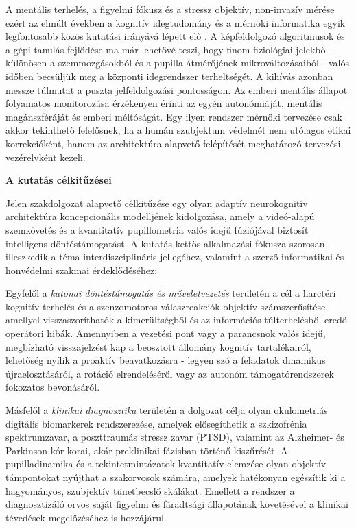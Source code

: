 \documentclass[12pt,a4paper,oneside]{book}
\begin{document}
A mentális terhelés, a figyelmi fókusz és a stressz objektív, non-invazív mérése ezért az elmúlt években a kognitív idegtudomány és a mérnöki informatika egyik legfontosabb közös kutatási irányává lépett elő \cite{eckstein2017}. A képfeldolgozó algoritmusok és a gépi tanulás fejlődése ma már lehetővé teszi, hogy finom fiziológiai jelekből - különösen a szemmozgásokból és a pupilla átmérőjének mikrováltozásaiból - valós időben becsüljük meg a központi idegrendszer terheltségét. A kihívás azonban messze túlmutat a puszta jelfeldolgozási pontosságon. Az emberi mentális állapot folyamatos monitorozása érzékenyen érinti az egyén autonómiáját, mentális magánszféráját és emberi méltóságát. Egy ilyen rendszer mérnöki tervezése csak akkor tekinthető felelősnek, ha a humán szubjektum védelmét nem utólagos etikai korrekcióként, hanem az architektúra alapvető felépítését meghatározó tervezési vezérelvként kezeli.

\vspace{0.5cm}
\newpage
\noindent\textbf{\large A kutatás célkitűzései}
\vspace{0.5cm}

Jelen szakdolgozat alapvető célkitűzése egy olyan adaptív neurokognitív architektúra koncepcionális modelljének kidolgozása, amely a videó-alapú szemkövetés és a kvantitatív pupillometria valós idejű fúziójával biztosít intelligens döntéstámogatást. A kutatás kettős alkalmazási fókusza szorosan illeszkedik a téma interdiszciplináris jellegéhez, valamint a szerző informatikai és honvédelmi szakmai érdeklődéséhez:

Egyfelől a \emph{katonai döntéstámogatás és műveletvezetés} területén a cél a harctéri kognitív terhelés és a szenzomotoros válaszreakciók objektív számszerűsítése, amellyel visszaszoríthatók a kimerültségből és az információs túlterhelésből eredő operátori hibák. Amennyiben a vezetési pont vagy a parancsnok valós idejű, megbízható visszajelzést kap a beosztott állomány kognitív tartalékairól, lehetőség nyílik a proaktív beavatkozásra - legyen szó a feladatok dinamikus újraelosztásáról, a rotáció elrendeléséről vagy az autonóm támogatórendszerek fokozatos bevonásáról.

Másfelől a \emph{klinikai diagnosztika} területén a dolgozat célja olyan okulometriás digitális biomarkerek rendszerezése, amelyek elősegíthetik a szkizofrénia spektrumzavar, a poszttraumás stressz zavar (PTSD), valamint az Alzheimer- és Parkinson-kór korai, akár preklinikai fázisban történő kiszűrését. A pupilladinamika és a tekintetmintázatok kvantitatív elemzése olyan objektív támpontokat nyújthat a szakorvosok számára, amelyek hatékonyan egészítik ki a hagyományos, szubjektív tünetbecslő skálákat. Emellett a rendszer a diagnosztizáló orvos saját figyelmi és fáradtsági állapotának követésével a klinikai tévedések megelőzéséhez is hozzájárul.
\end{document}
